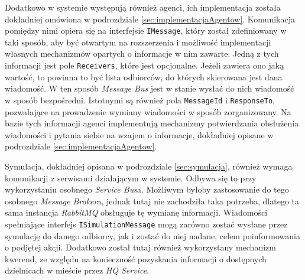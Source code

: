 \par Dodatkowo w systemie występują również agenci, ich implementacja została dokładniej omówiona w podrozdziale \ref{sec:implementacjaAgentow}. Komunikacja pomiędzy nimi opiera się na interfejsie \texttt{IMessage}, który został zdefiniowany w taki sposób, aby być otwartym na rozszerzenia i możliwość implementacji własnych mechanizmów opartych o informacje w nim zawarte. Jedną z tych informacji jest pole \texttt{Receivers}, które jest opcjonalne. Jeżeli zawiera ono jaką wartość, to powinna to być lista odbiorców, do których skierowana jest dana wiadomość. W ten sposób \emph{Message Bus} jest w stanie wysłać do nich wiadomość w sposób bezpośredni. Istotnymi są również pola \texttt{MessageId} i \texttt{ResponseTo}, pozwalające na prowadzenie wymiany wiadomości w sposób zorganizowany. Na bazie tych informacji agenci implementują mechanizmy potwierdzania obsłużenia wiadomości i pytania siebie na wzajem o informacje, dokładniej opisane w podrozdziale \ref{sec:implementacjaAgentow}.

\par Symulacja, dokładniej opisana w podrozdziale \ref{sec:symulacja}, również wymaga komunikacji z serwisami działającym w systemie. Odbywa się to przy wykorzystaniu osobnego \emph{Service Bus}a. Możliwym byłoby zastosowanie do tego osobnego \emph{Message Broker}a, jednak tutaj nie zachodziła taka potrzeba, dlatego ta sama instancja \emph{RabbitMQ} obsługuje tę wymianę informacji. Wiadomości spełniające interfejs \texttt{ISimulationMessage} mogą zarówno zostać wysłane przez symulację do danego odbiorcy, jak i zostać do niej nadane, celem poinformowania o podjętej akcji. Dodatkowo został tutaj również wykorzystany mechanizm kwerend, ze względu na konieczność pozyskania informacji o dostępnych dzielnicach w mieście przez \emph{HQ Service}.